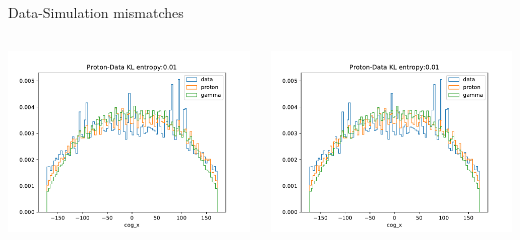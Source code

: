 \begin{frame}[t]{Data-Simulation mismatches}
\begin{columns}[onlytextwidth]
    \begin{column}{0.475\textwidth}
        \includegraphics[width=1.1\textwidth,page=11]{fig/feature_comp_cuts.pdf}
    \end{column}
    \begin{column}{0.475\textwidth}
        \includegraphics[width=1.1\textwidth,page=6]{fig/feature_comp_cuts.pdf}
    \end{column}
\end{columns}
\end{frame}

